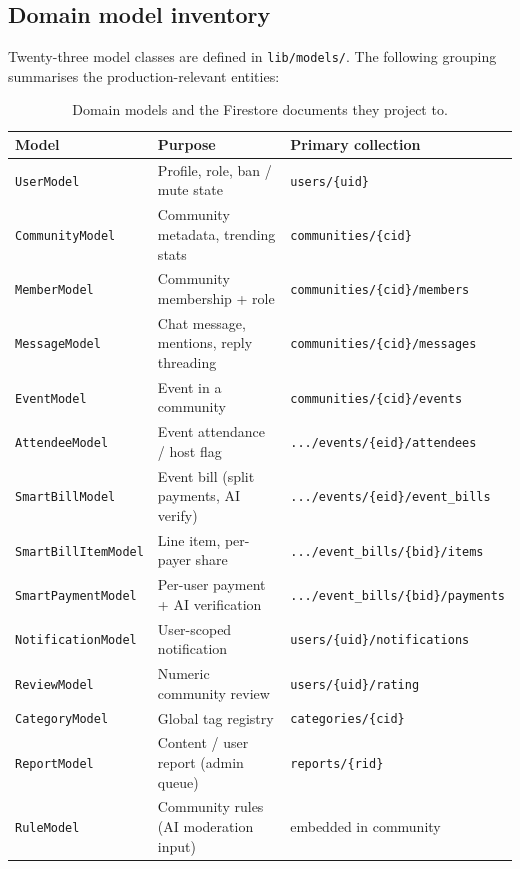 \documentclass[11pt,a4paper]{article}
\begin{document}
\subsection{Domain model inventory}

Twenty-three model classes are defined in \texttt{lib/models/}. The
following grouping summarises the production-relevant entities:

\begin{table}[h]
\centering\small
\begin{tabularx}{\linewidth}{@{}lXl@{}}
\toprule
\textbf{Model} & \textbf{Purpose} & \textbf{Primary collection} \\
\midrule
\texttt{UserModel}          & Profile, role, ban / mute state          & \texttt{users/\{uid\}} \\
\texttt{CommunityModel}     & Community metadata, trending stats       & \texttt{communities/\{cid\}} \\
\texttt{MemberModel}        & Community membership + role              & \texttt{communities/\{cid\}/members} \\
\texttt{MessageModel}       & Chat message, mentions, reply threading  & \texttt{communities/\{cid\}/messages} \\
\texttt{EventModel}         & Event in a community                     & \texttt{communities/\{cid\}/events} \\
\texttt{AttendeeModel}      & Event attendance / host flag             & \texttt{.../events/\{eid\}/attendees} \\
\texttt{SmartBillModel}     & Event bill (split payments, AI verify)   & \texttt{.../events/\{eid\}/event\_bills} \\
\texttt{SmartBillItemModel} & Line item, per-payer share               & \texttt{.../event\_bills/\{bid\}/items} \\
\texttt{SmartPaymentModel}  & Per-user payment + AI verification       & \texttt{.../event\_bills/\{bid\}/payments} \\
\texttt{NotificationModel}  & User-scoped notification                 & \texttt{users/\{uid\}/notifications} \\
\texttt{ReviewModel}        & Numeric community review                 & \texttt{users/\{uid\}/rating} \\
\texttt{CategoryModel}      & Global tag registry                      & \texttt{categories/\{cid\}} \\
\texttt{ReportModel}        & Content / user report (admin queue)      & \texttt{reports/\{rid\}} \\
\texttt{RuleModel}          & Community rules (AI moderation input)    & embedded in community \\
\bottomrule
\end{tabularx}
\caption{Domain models and the Firestore documents they project to.}
\end{table}
\end{document}
